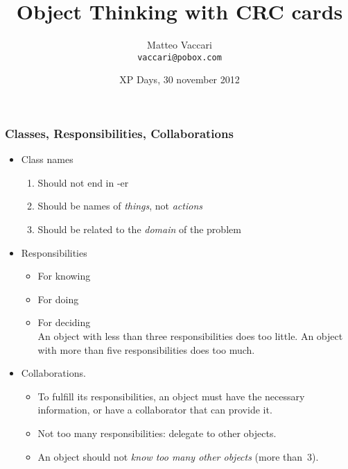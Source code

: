 \documentclass[handout,t,12pt]{beamer}
\title{Object Thinking with CRC cards}
\author[@xpmatteo]{Matteo Vaccari \\ \texttt{vaccari@pobox.com}}
\institute{}
\date[XP Days 2012]{XP Days, 30 november 2012}
\begin{document}
  \begin{frame}
    \titlepage
  \end{frame}

  \begin{frame}\frametitle{Classes, Responsibilities, Collaborations}

    \begin{itemize}
      \item Class names
      \begin{enumerate}
        \item Should not end in -er
        \item Should be names of \emph{things}, not \emph{actions}
        \item Should be related to the \emph{domain} of the problem 
      \end{enumerate}
      \item Responsibilities
      \begin{itemize}
        \item For knowing
        \item For doing
        \item For deciding\\
        An object with less than three responsibilities does too little.  An object with more than five responsibilities does too much.  
      \end{itemize}
      \item Collaborations. 
      \begin{itemize}
        \item To fulfill its responsibilities, an object must have the necessary information, or have a collaborator that can provide it.
        \item Not too many responsibilities: delegate to other objects.
        \item An object should not \emph{know too many other objects} (more than~3).
      \end{itemize}
    \end{itemize}
  \end{frame}
\end{document}
